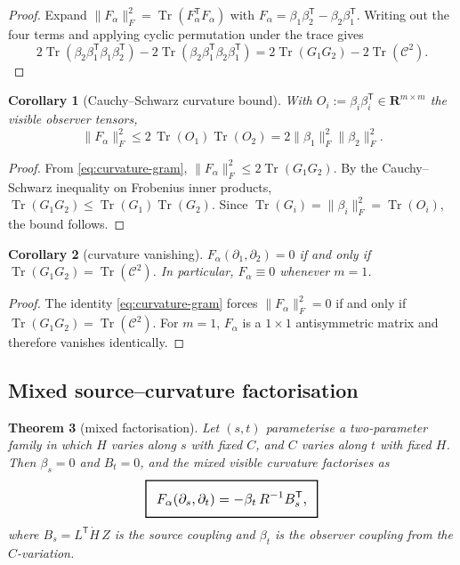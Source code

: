 \documentclass[11pt,a4paper]{article}
\numberwithin{equation}{section}
\DeclareMathOperator{\Tr}{Tr}
\newcommand{\R}{\mathbf R}
\newcommand{\geomboxed}[1]{%
  \setlength{\fboxsep}{8pt}%
  \setlength{\fboxrule}{0.9pt}%
  \fbox{\scalebox{1.10}{$\displaystyle #1$}}%
}
\theoremstyle{thmcompact}
\newtheorem{theorem}{Theorem}[section]
\newtheorem{corollary}[theorem]{Corollary}
\theoremstyle{remark}
\begin{document}
\begin{proof}
Expand $\|F_\alpha\|_F^2=\Tr(F_\alpha^{\mathsf T}F_\alpha)$ with $F_\alpha=\beta_1\beta_2^{\mathsf T}-\beta_2\beta_1^{\mathsf T}$. Writing out the four terms and applying cyclic permutation under the trace gives
\[
2\Tr(\beta_2\beta_1^{\mathsf T}\beta_1\beta_2^{\mathsf T})-2\Tr(\beta_2\beta_1^{\mathsf T}\beta_2\beta_1^{\mathsf T})
=2\Tr(G_1G_2)-2\Tr(\mathcal C^2).
\]
\end{proof}

\begin{corollary}[Cauchy--Schwarz curvature bound]\label{cor:cs-bound}
With $O_i:=\beta_i\beta_i^{\mathsf T}\in\R^{m\times m}$ the visible observer tensors,
\begin{equation}
\|F_\alpha\|_F^2\le 2\,\Tr(O_1)\Tr(O_2)=2\|\beta_1\|_F^2\|\beta_2\|_F^2.
\label{eq:cs-bound}
\end{equation}
\end{corollary}

\begin{proof}
From \eqref{eq:curvature-gram}, $\|F_\alpha\|_F^2\le 2\Tr(G_1G_2)$. By the Cauchy--Schwarz inequality on Frobenius inner products, $\Tr(G_1G_2)\le \Tr(G_1)\Tr(G_2)$. Since $\Tr(G_i)=\|\beta_i\|_F^2=\Tr(O_i)$, the bound follows.
\end{proof}

\begin{corollary}[curvature vanishing]\label{cor:curvature-vanishing}
$F_\alpha(\partial_1,\partial_2)=0$ if and only if $\Tr(G_1G_2)=\Tr(\mathcal C^2)$. In particular, $F_\alpha\equiv0$ whenever $m=1$.
\end{corollary}

\begin{proof}
The identity \eqref{eq:curvature-gram} forces $\|F_\alpha\|_F^2=0$ if and only if $\Tr(G_1G_2)=\Tr(\mathcal C^2)$. For $m=1$, $F_\alpha$ is a $1\times 1$ antisymmetric matrix and therefore vanishes identically.
\end{proof}

\subsection{Mixed source--curvature factorisation}

\begin{theorem}[mixed factorisation]\label{thm:mixed-factorisation}
Let $(s,t)$ parameterise a two-parameter family in which $H$ varies along $s$ with fixed $C$, and $C$ varies along $t$ with fixed $H$. Then $\beta_s=0$ and $B_t=0$, and the mixed visible curvature factorises as
\begin{equation}
\geomboxed{F_\alpha(\partial_s,\partial_t)=-\beta_t\,R^{-1}B_s^{\mathsf T},}
\label{eq:mixed-factorisation}
\end{equation}
where $B_s=L^{\mathsf T}\dot H\,Z$ is the source coupling and $\beta_t$ is the observer coupling from the $C$-variation.
\end{theorem}
\end{document}
